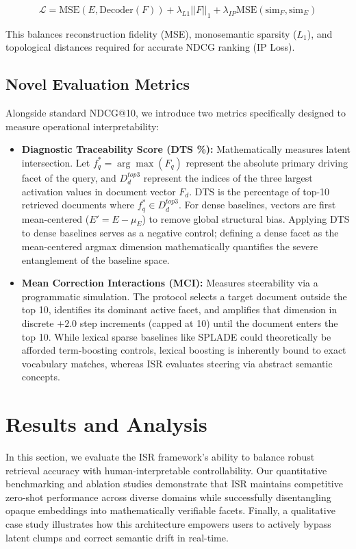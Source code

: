 \documentclass[sigconf,authordraft]{acmart}
\begin{document}
\begin{equation}
\mathcal{L} = \text{MSE}(E, \text{Decoder}(F)) + \lambda_{L1} ||F||_1 + \lambda_{IP} \text{MSE}(\text{sim}_F, \text{sim}_E)
\end{equation}

This balances reconstruction fidelity (MSE), monosemantic sparsity ($L_1$), and topological distances required for accurate NDCG ranking (IP Loss).

\subsection{Novel Evaluation Metrics}
Alongside standard NDCG@10, we introduce two metrics specifically designed to measure operational interpretability:

\begin{itemize}
    \item \textbf{Diagnostic Traceability Score (DTS \%):} Mathematically measures latent intersection. Let $f_q^* = \arg\max(F_q)$ represent the absolute primary driving facet of the query, and $D_d^{top3}$ represent the indices of the three largest activation values in document vector $F_d$. DTS is the percentage of top-10 retrieved documents where $f_q^* \in D_d^{top3}$. For dense baselines, vectors are first mean-centered ($E' = E - \mu_E$) to remove global structural bias. Applying DTS to dense baselines serves as a negative control; defining a dense facet as the mean-centered argmax dimension mathematically quantifies the severe entanglement of the baseline space.
    \item \textbf{Mean Correction Interactions (MCI):} Measures steerability via a programmatic simulation. The protocol selects a target document outside the top 10, identifies its dominant active facet, and amplifies that dimension in discrete $+2.0$ step increments (capped at 10) until the document enters the top 10. While lexical sparse baselines like SPLADE could theoretically be afforded term-boosting controls, lexical boosting is inherently bound to exact vocabulary matches, whereas ISR evaluates steering via abstract semantic concepts.
\end{itemize}

\section{Results and Analysis}
In this section, we evaluate the ISR framework's ability to balance robust retrieval accuracy with human-interpretable controllability. Our quantitative benchmarking and ablation studies demonstrate that ISR maintains competitive zero-shot performance across diverse domains while successfully disentangling opaque embeddings into mathematically verifiable facets. Finally, a qualitative case study illustrates how this architecture empowers users to actively bypass latent clumps and correct semantic drift in real-time.
\end{document}
